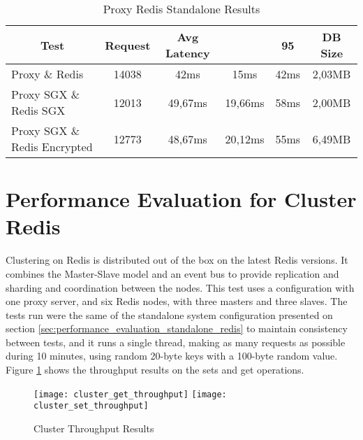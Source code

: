 \begin{table}[ht]
	\caption{Proxy Redis Standalone Results}
	\label{tab:proxy_redis_standalone_latency_results}
\centering
\begin{tabular}{lccccc}
	\toprule
	\multicolumn{1}{c}{\textbf{Test}} & \pmb{\#}\textbf{Request} & \textbf{Avg Latency} & \pmb{\ensuremath{\sigma}} & \textbf{95}\pmb{\%} & \textbf{DB Size} \\
	\midrule
		Proxy \& Redis & 14038 & 42ms & 15ms & 42ms & 2,03MB 	\\
		Proxy SGX \& Redis SGX & 12013 & 49,67ms & 19,66ms & 58ms & 2,00MB \\
		Proxy SGX \& Redis Encrypted & 12773 & 48,67ms & 20,12ms & 55ms & 6,49MB \\
	\bottomrule
\end{tabular}
\end{table}

\section{Performance Evaluation for Cluster Redis}
\label{sec:performance_evaluation_cluster_redis}

Clustering on Redis is distributed out of the box on the latest Redis versions. It combines the Master-Slave model and an event bus to provide replication and sharding and coordination between the nodes. This test uses a configuration with one proxy server, and six Redis nodes, with three masters and three slaves. The tests run were the same of the standalone system configuration presented on section \ref{sec:performance_evaluation_standalone_redis} to maintain consistency between tests, and it runs a single thread, making as many requests as possible during 10 minutes, using random 20-byte keys with a 100-byte random value. Figure \ref{fig:cluster_throughput_results} shows the throughput results on the sets and get operations.

\begin{figure}[htbp]
  \centering
  \hspace*{-7mm}
    {\texttt{[image: cluster\_get\_throughput]}}%
    {\texttt{[image: cluster\_set\_throughput]}}%
  \caption{Cluster Throughput Results}
  \label{fig:cluster_throughput_results}
\end{figure}

